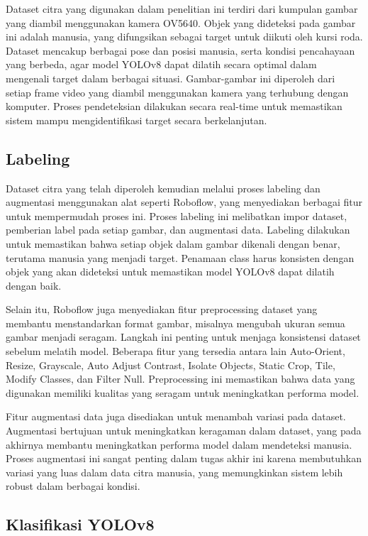 Dataset citra yang digunakan dalam penelitian ini terdiri dari kumpulan gambar yang diambil menggunakan kamera OV5640. Objek yang dideteksi pada gambar ini adalah manusia, yang difungsikan sebagai target untuk diikuti oleh kursi roda. Dataset mencakup berbagai pose dan posisi manusia, serta kondisi pencahayaan yang berbeda, agar model YOLOv8 dapat dilatih secara optimal dalam mengenali target dalam berbagai situasi. Gambar-gambar ini diperoleh dari setiap frame video yang diambil menggunakan kamera yang terhubung dengan komputer. Proses pendeteksian dilakukan secara real-time untuk memastikan sistem mampu mengidentifikasi target secara berkelanjutan.

\subsection{Labeling}
\label{subsec:labeling}

Dataset citra yang telah diperoleh kemudian melalui proses labeling dan augmentasi menggunakan alat seperti Roboflow, yang menyediakan berbagai fitur untuk mempermudah proses ini. Proses labeling ini melibatkan impor dataset, pemberian label pada setiap gambar, dan augmentasi data. Labeling dilakukan untuk memastikan bahwa setiap objek dalam gambar dikenali dengan benar, terutama manusia yang menjadi target. Penamaan class harus konsisten dengan objek yang akan dideteksi untuk memastikan model YOLOv8 dapat dilatih dengan baik.

Selain itu, Roboflow juga menyediakan fitur preprocessing dataset yang membantu menstandarkan format gambar, misalnya mengubah ukuran semua gambar menjadi seragam. Langkah ini penting untuk menjaga konsistensi dataset sebelum melatih model. Beberapa fitur yang tersedia antara lain Auto-Orient, Resize, Grayscale, Auto Adjust Contrast, Isolate Objects, Static Crop, Tile, Modify Classes, dan Filter Null. Preprocessing ini memastikan bahwa data yang digunakan memiliki kualitas yang seragam untuk meningkatkan performa model.

Fitur augmentasi data juga disediakan untuk menambah variasi pada dataset. Augmentasi bertujuan untuk meningkatkan keragaman dalam dataset, yang pada akhirnya membantu meningkatkan performa model dalam mendeteksi manusia. Proses augmentasi ini sangat penting dalam tugas akhir ini karena membutuhkan variasi yang luas dalam data citra manusia, yang memungkinkan sistem lebih robust dalam berbagai kondisi.

\subsection{Klasifikasi YOLOv8}
\label{subsec:klasifikasiyolov8}

